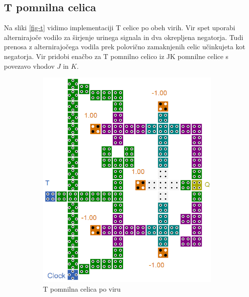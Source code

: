 \documentclass[a4paper, 11pt]{article}
\begin{document}
\subsection{T pomnilna celica}
Na sliki \ref{fig-t} vidimo implementaciji T celice po obeh virih. Vir \cite{quantum_dot} spet uporabi alternirajoče vodilo za širjenje urinega signala in dva okrepljena negatorja. Tudi prenosa z alternirajočega vodila prek polovično zamaknjenih celic učinkujeta kot negatorja. Vir \cite{a_novel_approach} pridobi enačbo za T pomnilno celico iz JK pomnilne celice s povezavo vhodov $J$ in $K$.
\begin{figure}[h!]
	\centering
	\begin{subfigure}[b]{0.4\textwidth}
	\includegraphics[width=\textwidth]{../img/vir_4/t.png}
	\caption{T pomnilna celica po viru \cite{quantum_dot}}
	\label{fig-t-1}
	\end{subfigure}
	\begin{subfigure}[b]{0.4\textwidth}

\end{subfigure}
\end{figure}
\end{document}
